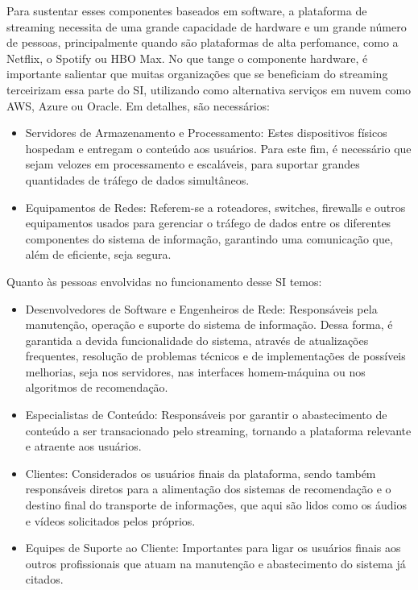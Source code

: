 \documentclass[conference]{IEEEtran}
\begin{document}
Para sustentar esses componentes baseados em software, a plataforma de streaming necessita de uma grande capacidade de hardware e um grande número de pessoas, principalmente quando são plataformas de alta perfomance, como a Netflix, o Spotify ou HBO Max. No que tange o componente hardware, é importante salientar que muitas organizações que se beneficiam do streaming terceirizam essa parte do SI, utilizando como alternativa serviços em nuvem como AWS, Azure ou Oracle. Em detalhes, são necessários: 

\begin{itemize}
\item Servidores de Armazenamento e Processamento: Estes dispositivos físicos hospedam e entregam o conteúdo aos usuários. Para este fim, é necessário que sejam velozes em processamento e escaláveis, para suportar grandes quantidades de tráfego de dados simultâneos.
\item Equipamentos de Redes: Referem-se a roteadores, switches, firewalls e outros equipamentos usados para gerenciar o tráfego de dados entre os diferentes componentes do sistema de informação, garantindo uma comunicação que, além de eficiente, seja segura.
\end{itemize}

Quanto às pessoas envolvidas no funcionamento desse SI temos:
\begin{itemize}
\item Desenvolvedores de Software e Engenheiros de Rede: Responsáveis pela manutenção, operação e suporte do sistema de informação. Dessa forma, é garantida a devida funcionalidade do sistema, através de atualizações frequentes, resolução de problemas técnicos e de implementações de possíveis melhorias, seja nos servidores, nas interfaces homem-máquina ou nos algoritmos de recomendação.
\item Especialistas de Conteúdo: Responsáveis por garantir o abastecimento de conteúdo a ser transacionado pelo streaming, tornando a plataforma relevante e atraente aos usuários.
\item Clientes: Considerados os usuários finais da plataforma, sendo também responsáveis diretos para a alimentação dos sistemas de recomendação e o destino final do transporte de informações, que aqui são lidos como os áudios e vídeos solicitados pelos próprios.
\item Equipes de Suporte ao Cliente: Importantes para ligar os usuários finais aos outros profissionais que atuam na manutenção e abastecimento do sistema já citados.
\end{itemize}
\end{document}
